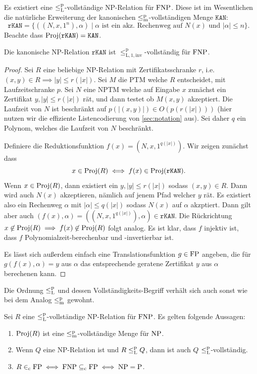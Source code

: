 Es existiert eine $\leq_\mathrm{L}^\mathrm{p}$-vollständige NP-Relation für $\mathrm{FNP}$. Diese ist im Wesentlichen die natürliche Erweiterung der kanonischen $\leq_\mathrm{m}^\mathrm{p}$-vollständigen Menge $\mathtt{KAN}$:
\[ \mathtt{rKAN} = \{ ((N,x,1^n), \alpha) \mid \text{$\alpha$ ist ein akz. Rechenweg auf $N(x)$ und $|\alpha|\leq n$} \}. \]
Beachte dass $\operatorname{Proj}(\mathtt{rKAN})=\mathtt{KAN}$.
\begin{theorem}
    Die kanonische NP-Relation $\mathtt{rKAN}$ 
    ist $\leq_\mathrm{L,1,inv}^\mathrm p$-vollständig für $\mathrm{FNP}$.
\end{theorem}
\begin{proof}
    Sei $R$ eine beliebige NP-Relation mit Zertifikatsschranke $r$, i.e. $(x,y)\in R\implies |y|\leq r(|x|)$. Sei $M$ die PTM welche $R$ entscheidet, mit Laufzeitschranke $p$. Sei $N$ eine NPTM welche auf Eingabe $x$ zunächst ein Zertifikat $y, |y|\leq r(|x|)$ rät, und dann testet ob $M(x,y)$ akzeptiert. Die Laufzeit von $N$ ist beschränkt auf $p(|(x,y)|)\in O(p(r(|x|)))$ (hier nutzen wir die effiziente Listencodierung von \ref{sec:notation} aus). Sei daher $q$ ein Polynom, welches die Laufzeit von $N$ beschränkt.

    Definiere die Reduktionsfunktion $f(x)=(N, x, 1^{q(|x|)})$. Wir zeigen zunächst dass
    \[ x\in \operatorname{Proj}(R)\iff f(x)\in \operatorname{Proj}(\mathtt{rKAN}). \]
    Wenn $x\in\operatorname{Proj}(R)$, dann existiert ein $y, |y|\leq r(|x|)$ sodass $(x,y)\in R$. Dann wird auch $N(x)$ akzeptieren, nämlich auf jenem Pfad welcher $y$ rät. Es existiert also ein Rechenweg $\alpha$ mit $|\alpha|\leq q(|x|)$ sodass $N(x)$ auf $\alpha$ akzptiert. Dann gilt aber auch $(f(x), \alpha)=((N,x,1^{q(|x|)}),\alpha)\in \mathtt{rKAN}$.
    Die Rückrichtung $x\not\in \operatorname{Proj}(R)\implies f(x)\not\in\operatorname{Proj}(R)$ folgt analog.
    Es ist klar, dass $f$ injektiv ist, dass $f$ Polynomialzeit-berechenbar und -invertierbar ist. 

    Es lässt sich außerdem einfach eine Translationsfunktion $g\in \mathrm{FP}$ angeben, die für $g(f(x), \alpha)=y$ aus $\alpha$ das entsprechende geratene Zertifikat $y$ aus $\alpha$ berechenen kann.
\end{proof}

Die Ordnung $\leq_\mathrm{L}^\mathrm{p}$ und dessen Vollständigkeits-Begriff verhält sich auch sonst wie bei dem Analog $\leq_\mathrm{m}^\mathrm{p}$ gewohnt.
\begin{lemma}\label{lemma:fnp-completeness}
    Sei $R$ eine $\leq_\mathrm{L}^\mathrm{p}$-vollständige NP-Relation für $\mathrm{FNP}$. Es gelten folgende Aussagen:
    \begin{enumerate}
        \item $\operatorname{Proj}(R)$ ist eine $\leq_\mathrm{m}^\mathrm{p}$-vollständige Menge für $\mathrm{NP}$.
        \item Wenn $Q$ eine NP-Relation ist und $R\leq_\mathrm{L}^\mathrm{p} Q$, dann ist auch $Q$ $\leq_\mathrm{L}^\mathrm{p}$-vollständig.
        \item $R\in_\mathrm{c} \mathrm{FP} \iff \mathrm{FNP} \subseteq_\mathrm{c} \mathrm{FP} \iff \mathrm{NP}=\mathrm{P}$.
    \end{enumerate}
\end{lemma}

